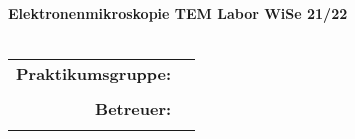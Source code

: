 \begin{titlepage}

\vspace{19mm}

\begin{center}
	{\LARGE
		\textbf{\versuch} \\ {\normalsize \textbf{\untertitel}} \\
	}
	\vspace{8mm}
	\textbf{Elektronenmikroskopie TEM Labor WiSe 21/22}\\
	\datumversuch \\
    
	\vspace{10mm}
\end{center}

\begin{table}[H]
\centering 
\begin{tabular}{r l}
\hspace{2cm}\textbf{Praktikumsgruppe:}
	&	\studentnameeins	\\
	&	\studentnamezwei	\\



\textbf{Betreuer:}
	&	\betreuer				\\
	&						\\
\end{tabular}
\end{table}

\vspace{5mm}

\end{titlepage}